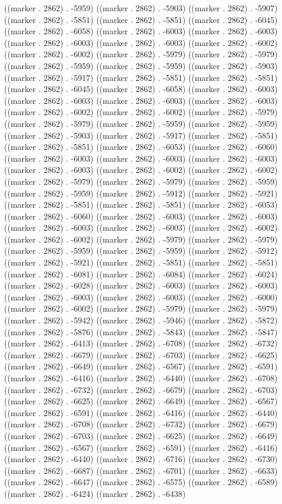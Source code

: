 ((marker . 2862) . -5959) ((marker . 2862) . -5903) ((marker . 2862) . -5907) ((marker . 2862) . -5851) ((marker . 2862) . -5851) ((marker . 2862) . -6045) ((marker . 2862) . -6058) ((marker . 2862) . -6003) ((marker . 2862) . -6003) ((marker . 2862) . -6003) ((marker . 2862) . -6003) ((marker . 2862) . -6002) ((marker . 2862) . -6002) ((marker . 2862) . -5979) ((marker . 2862) . -5979) ((marker . 2862) . -5959) ((marker . 2862) . -5959) ((marker . 2862) . -5903) ((marker . 2862) . -5917) ((marker . 2862) . -5851) ((marker . 2862) . -5851) ((marker . 2862) . -6045) ((marker . 2862) . -6058) ((marker . 2862) . -6003) ((marker . 2862) . -6003) ((marker . 2862) . -6003) ((marker . 2862) . -6003) ((marker . 2862) . -6002) ((marker . 2862) . -6002) ((marker . 2862) . -5979) ((marker . 2862) . -5979) ((marker . 2862) . -5959) ((marker . 2862) . -5959) ((marker . 2862) . -5903) ((marker . 2862) . -5917) ((marker . 2862) . -5851) ((marker . 2862) . -5851) ((marker . 2862) . -6053) ((marker . 2862) . -6060) ((marker . 2862) . -6003) ((marker . 2862) . -6003) ((marker . 2862) . -6003) ((marker . 2862) . -6003) ((marker . 2862) . -6002) ((marker . 2862) . -6002) ((marker . 2862) . -5979) ((marker . 2862) . -5979) ((marker . 2862) . -5959) ((marker . 2862) . -5959) ((marker . 2862) . -5912) ((marker . 2862) . -5921) ((marker . 2862) . -5851) ((marker . 2862) . -5851) ((marker . 2862) . -6053) ((marker . 2862) . -6060) ((marker . 2862) . -6003) ((marker . 2862) . -6003) ((marker . 2862) . -6003) ((marker . 2862) . -6003) ((marker . 2862) . -6002) ((marker . 2862) . -6002) ((marker . 2862) . -5979) ((marker . 2862) . -5979) ((marker . 2862) . -5959) ((marker . 2862) . -5959) ((marker . 2862) . -5912) ((marker . 2862) . -5921) ((marker . 2862) . -5851) ((marker . 2862) . -5851) ((marker . 2862) . -6081) ((marker . 2862) . -6084) ((marker . 2862) . -6024) ((marker . 2862) . -6028) ((marker . 2862) . -6003) ((marker . 2862) . -6003) ((marker . 2862) . -6003) ((marker . 2862) . -6003) ((marker . 2862) . -6000) ((marker . 2862) . -6002) ((marker . 2862) . -5979) ((marker . 2862) . -5979) ((marker . 2862) . -5942) ((marker . 2862) . -5946) ((marker . 2862) . -5872) ((marker . 2862) . -5876) ((marker . 2862) . -5843) ((marker . 2862) . -5847) ((marker . 2862) . -6413) ((marker . 2862) . -6708) ((marker . 2862) . -6732) ((marker . 2862) . -6679) ((marker . 2862) . -6703) ((marker . 2862) . -6625) ((marker . 2862) . -6649) ((marker . 2862) . -6567) ((marker . 2862) . -6591) ((marker . 2862) . -6416) ((marker . 2862) . -6440) ((marker . 2862) . -6708) ((marker . 2862) . -6732) ((marker . 2862) . -6679) ((marker . 2862) . -6703) ((marker . 2862) . -6625) ((marker . 2862) . -6649) ((marker . 2862) . -6567) ((marker . 2862) . -6591) ((marker . 2862) . -6416) ((marker . 2862) . -6440) ((marker . 2862) . -6708) ((marker . 2862) . -6732) ((marker . 2862) . -6679) ((marker . 2862) . -6703) ((marker . 2862) . -6625) ((marker . 2862) . -6649) ((marker . 2862) . -6567) ((marker . 2862) . -6591) ((marker . 2862) . -6416) ((marker . 2862) . -6440) ((marker . 2862) . -6716) ((marker . 2862) . -6730) ((marker . 2862) . -6687) ((marker . 2862) . -6701) ((marker . 2862) . -6633) ((marker . 2862) . -6647) ((marker . 2862) . -6575) ((marker . 2862) . -6589) ((marker . 2862) . -6424) ((marker . 2862) . -6438) 